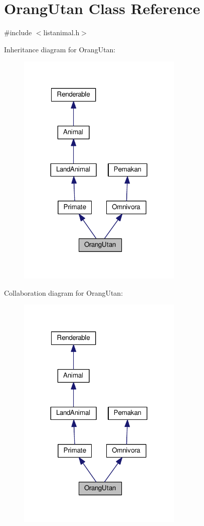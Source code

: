 \hypertarget{classOrangUtan}{}\section{Orang\+Utan Class Reference}
\label{classOrangUtan}


{\ttfamily \#include $<$listanimal.\+h$>$}



Inheritance diagram for Orang\+Utan\+:
\nopagebreak
\begin{figure}[H]
\begin{center}
\leavevmode
\includegraphics[width=224pt]{classOrangUtan__inherit__graph}
\end{center}
\end{figure}


Collaboration diagram for Orang\+Utan\+:
\nopagebreak
\begin{figure}[H]
\begin{center}
\leavevmode
\includegraphics[width=224pt]{classOrangUtan__coll__graph}
\end{center}
\end{figure}

